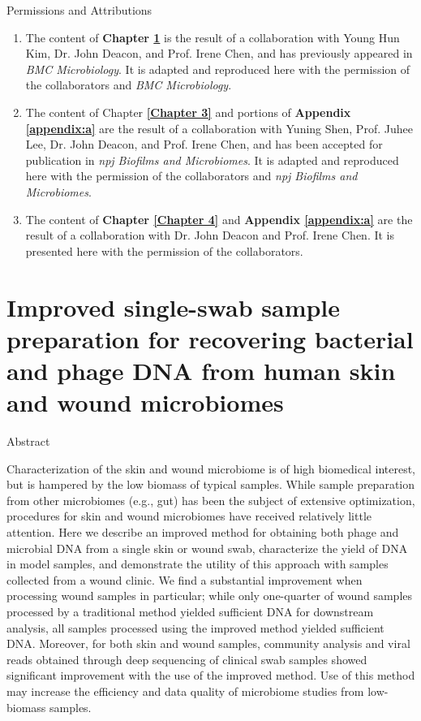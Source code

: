 \documentclass[oneside,12pt,final]{sty/ucthesis-CA2012}
\begin{document}
\begin{mainmatter}
\begin{section}{Permissions and Attributions}
\begin{enumerate}

\item The content of \textbf{Chapter \ref{Chapter 2}} is the result of a collaboration with Young Hun Kim, Dr. John Deacon, and Prof. Irene Chen, and has previously appeared in \textit{BMC Microbiology}\cite{RN41}. It is adapted and reproduced here with the permission of the collaborators and \textit{BMC Microbiology}.
\item The content of Chapter \textbf{\ref{Chapter 3}} and portions of \textbf{Appendix \ref{appendix:a}} are the result of a collaboration with Yuning Shen, Prof. Juhee Lee, Dr. John Deacon, and Prof. Irene Chen, and has been accepted for publication in \textit{npj Biofilms and Microbiomes}. It is adapted and reproduced here with the permission of the collaborators and \textit{npj Biofilms and Microbiomes}.
\item The content of \textbf{Chapter \ref{Chapter 4}} and \textbf{Appendix \ref{appendix:a}} are the result of a collaboration with Dr. John Deacon and Prof. Irene Chen. It is presented here with the permission of the collaborators.

\end{enumerate}
\end{section}

\chapter{Improved single-swab sample preparation for recovering bacterial and phage DNA from human skin and wound microbiomes}
\label{Chapter 2}
\begin{section}{Abstract}

Characterization of the skin and wound microbiome is of high biomedical interest, but is hampered by the low biomass of typical samples. While sample preparation from other microbiomes (e.g., gut) has been the subject of extensive optimization, procedures for skin and wound microbiomes have received relatively little attention. Here we describe an improved method for obtaining both phage and microbial DNA from a single skin or wound swab, characterize the yield of DNA in model samples, and demonstrate the utility of this approach with samples collected from a wound clinic. We find a substantial improvement when processing wound samples in particular; while only one-quarter of wound samples processed by a traditional method yielded sufficient DNA for downstream analysis, all samples processed using the improved method yielded sufficient DNA. Moreover, for both skin and wound samples, community analysis and viral reads obtained through deep sequencing of clinical swab samples showed significant improvement with the use of the improved method. Use of this method may increase the efficiency and data quality of microbiome studies from low-biomass samples.


\end{section}
\end{mainmatter}
\end{document}
